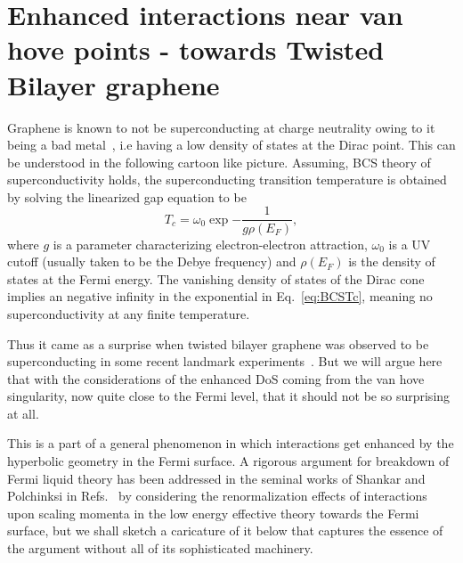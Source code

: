 \section{Enhanced interactions near van hove points - towards Twisted Bilayer graphene}
%
Graphene is known to not be superconducting at charge neutrality owing to it being a bad metal~\cite{efetov2014towards}, i.e having a low density of states at the Dirac point. This can be understood in the following cartoon like picture. Assuming, BCS theory of superconductivity holds, the superconducting transition temperature is obtained by solving the linearized gap equation to be 
\begin{equation}
    T_c = \omega_0 \exp{-\frac{1}{g\rho(E_F)}},
    \label{eq:BCSTc}
\end{equation}
where $g$ is a parameter characterizing electron-electron attraction, $\omega_0$ is a UV cutoff (usually taken to be the Debye frequency) and $\rho(E_F)$ is the density of states at the Fermi energy. The vanishing density of states of the Dirac cone implies an negative infinity in the exponential in Eq.~\eqref{eq:BCSTc}, meaning no superconductivity at any finite temperature.

\par
Thus it came as a surprise when twisted bilayer graphene was observed to be superconducting in some recent landmark experiments~\cite{Cao2018,Caocorrelated2018,oh2021evidence,lisi2021observation}. But we will argue here that with the considerations of the enhanced DoS coming from the van hove singularity, now quite close to the Fermi level, that it should not be so surprising at all. 

\par
This is a part of a general phenomenon in which interactions get enhanced by the hyperbolic geometry in the Fermi surface. A rigorous argument for breakdown of Fermi liquid theory has been addressed in the seminal works of Shankar and Polchinksi in Refs.~\cite{shankar1991renormalization,shankar1994renormalization,polchinski1992effective} by considering the renormalization effects of interactions upon scaling momenta in the low energy effective theory towards the Fermi surface, but we shall sketch a caricature of it below that captures the essence of the argument without all of its sophisticated machinery. 

